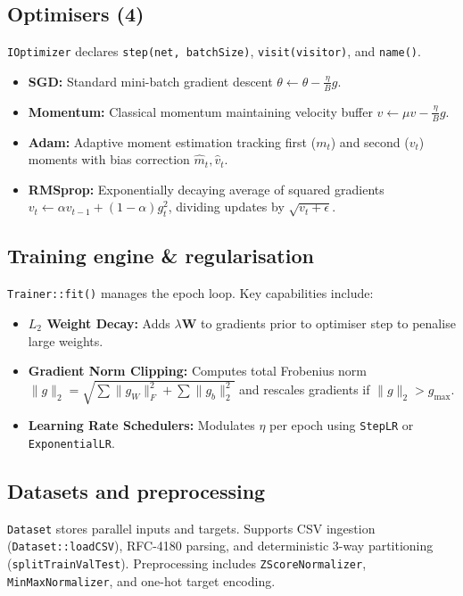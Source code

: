\documentclass[11pt,a4paper]{article}
\begin{document}
\subsection{Optimisers (4)}
\texttt{IOptimizer} declares \texttt{step(net, batchSize)}, \texttt{visit(visitor)}, and \texttt{name()}.
\begin{itemize}[itemsep=1pt]
    \item \textbf{SGD:} Standard mini-batch gradient descent $\theta \leftarrow \theta - \frac{\eta}{B} g$.
    \item \textbf{Momentum:} Classical momentum maintaining velocity buffer $v \leftarrow \mu v - \frac{\eta}{B} g$.
    \item \textbf{Adam:} Adaptive moment estimation tracking first ($m_t$) and second ($v_t$) moments with bias correction $\hat{m}_t, \hat{v}_t$.
    \item \textbf{RMSprop:} Exponentially decaying average of squared gradients $v_t \leftarrow \alpha v_{t-1} + (1-\alpha)g_t^2$, dividing updates by $\sqrt{v_t + \epsilon}$.
\end{itemize}

\subsection{Training engine \& regularisation}
\texttt{Trainer::fit()} manages the epoch loop. Key capabilities include:
\begin{itemize}[itemsep=1pt]
    \item \textbf{$L_2$ Weight Decay:} Adds $\lambda \mathbf{W}$ to gradients prior to optimiser step to penalise large weights.
    \item \textbf{Gradient Norm Clipping:} Computes total Frobenius norm $\|g\|_2 = \sqrt{\sum \|g_W\|_F^2 + \sum \|g_b\|_2^2}$ and rescales gradients if $\|g\|_2 > g_{\max}$.
    \item \textbf{Learning Rate Schedulers:} Modulates $\eta$ per epoch using \texttt{StepLR} or \texttt{ExponentialLR}.
\end{itemize}

\subsection{Datasets and preprocessing}
\texttt{Dataset} stores parallel inputs and targets. Supports CSV ingestion (\texttt{Dataset::loadCSV}), RFC-4180 parsing, and deterministic 3-way partitioning (\texttt{splitTrainValTest}). Preprocessing includes \texttt{ZScoreNormalizer}, \texttt{MinMaxNormalizer}, and one-hot target encoding.
\end{document}
